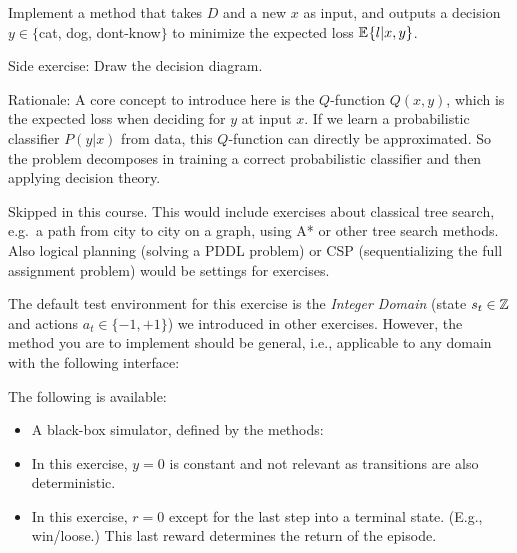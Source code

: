 Implement a method that takes $D$ and a new $x$ as input, and outputs a decision $y\in\{$cat, dog, dont-know$\}$ to minimize the expected loss $\mathbb{E}_{}\!\left\{l| x,y\right\}$.

Side exercise: Draw the decision diagram. 

Rationale: A core concept to introduce here is the $Q$-function $Q(x,y)$, which is the expected loss when deciding for $y$ at input $x$. If we learn a probabilistic classifier $P(y|x)$ from data, this $Q$-function can directly be approximated. So the problem decomposes in training a correct probabilistic classifier and then applying decision theory.




Skipped in this course. This would include exercises about classical tree search, e.g.\ a path from city to city on a graph, using A* or other tree search methods. Also logical planning (solving a PDDL problem) or CSP (sequentializing the full assignment problem) would be settings for exercises.


The default test environment for this exercise is the \emph{Integer Domain} (state $s_t\in{\mathbb{Z}}$ and actions $a_t\in\{-1,+1\}$) we introduced in other exercises. However, the method you are to implement should be general, i.e., applicable to any domain with the following interface:

The following is available:
\begin{itemize}
\item A black-box simulator, defined by the methods:
\item In this exercise, $y=0$ is constant and not relevant as transitions are also deterministic.
\item In this exercise, $r=0$ except for the last step into a terminal state. (E.g., win/loose.) This last reward determines the return of the episode.
\end{itemize}

